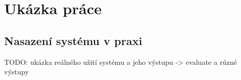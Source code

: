 \chapter{Ukázka práce}

\section{Nasazení systému v praxi}

TODO: ukázka reálného užití systému a jeho výstupu
    -> evaluate a rúzné výstupy
